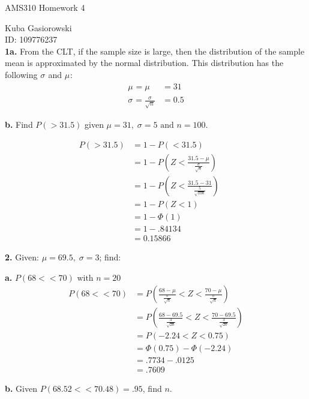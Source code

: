 \documentclass[12pt]{report}
\makeatletter
\newcommand*{\Xbar}{}%
\DeclareRobustCommand*{\Xbar}{%
	\mathpalette\@Xbar{}%
}
\newcommand*{\@Xbar}[2]{%
	\sbox0{$#1\mathrm{X}\m@th$}%
	\sbox2{$#1X\m@th$}%
	\rlap{%
		\hbox to\wd2{%
			\hfill
			$\overline{%
				\vrule width 0pt height\ht0 %
				\kern\wd0 %
			}$%
		}%
	}%
	\copy2 %
}
\makeatother
\begin{document}
\Large
\centering
AMS310 Homework 4

\justify
\normalsize

Kuba Gasiorowski\\
ID: 109776237\\

\noindent \textbf{1a.} From the CLT, if the sample size is large, then the distribution of the sample mean is approximated by the normal distribution. This distribution has the following $\sigma_{\Xbar}$ and $\mu_{\Xbar}$:
\begin{align*}
\mu_{\Xbar} = \mu &= \boxed{31}\\
\sigma_{\Xbar} = \frac{\sigma}{\sqrt{n}} &= \boxed{0.5}
\end{align*}

\noindent \textbf{b.} Find $P(\Xbar > 31.5)$ given $\mu = 31,\;\sigma = 5 \text{ and } n = 100$.


\begin{align*}
	P(\Xbar > 31.5) &= 1 - P(\Xbar < 31.5)&&\\
	&= 1 - P\left(Z < \frac{31.5 - \mu}{\frac{\sigma}{\sqrt{n}}}\right)\\
	&= 1 - P\left(Z < \frac{31.5 - 31}{\frac{5}{\sqrt{100}}}\right)\\
	&= 1 - P(Z < 1)\\
	&= 1 - \Phi(1)\\
	&= 1 - .84134\\
	&= \boxed{0.15866}
\end{align*}

\pagebreak
\noindent \textbf{2.} Given: $\mu=69.5, \; \sigma = 3$; find:

\noindent \textbf{a.} $P(68 < \Xbar < 70) \text{ with } n = 20$\\

\begin{align*}
	P(68 < \Xbar < 70) &= P\left(\frac{68 - \mu}{\frac{\sigma}{\sqrt{n}}} < Z < \frac{70 - \mu}{\frac{\sigma}{\sqrt{n}}}\right)\\
	&= P\left(\frac{68 - 69.5}{\frac{3}{\sqrt{20}}} < Z < \frac{70 - 69.5}{\frac{3}{\sqrt{20}}}\right)\\
	&= P(-2.24 < Z < 0.75)\\
	&= \Phi(0.75) - \Phi(-2.24)\\
	&= .7734 - .0125 \\
	&= \boxed{.7609}
\end{align*}

\noindent \textbf{b.} Given $P(68.52 < \Xbar < 70.48) = .95$, find $n$.
\end{document}
